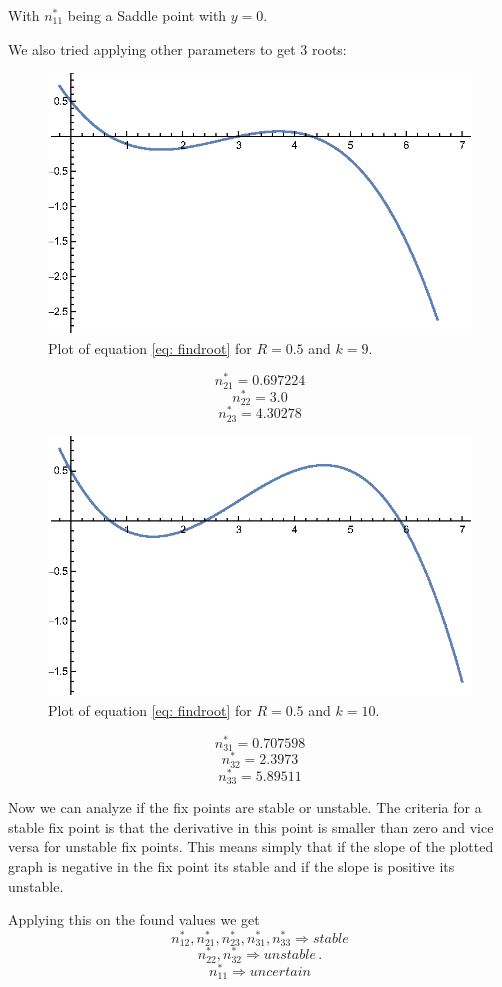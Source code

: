 \documentclass[11pt, a4paper, reqno]{scrartcl}
\begin{document}
	 	 With $n^{\ast}_{11}$ being a Saddle point with $y=0$.
	 	 
	 	 We also tried applying other parameters to get 3 roots:
	 	 
	 	 \begin{figure}[H]
	 	 	\centering
	 	 	\includegraphics[]{CompPhys_6-2_gr3.eps}
	 	 	\caption{Plot of equation \eqref{eq: findroot} for $R = 0.5$ and $k=9$.}
	 	 	\label{fig: 2}
	 	 \end{figure}
	 	 \[n^{\ast}_{21} = 0.697224\]
	 	 \[n^{\ast}_{22} = 3.0\]
	 	 \[n^{\ast}_{23} = 4.30278\]
	 	 \begin{figure}[H]
	 	 	\centering
	 	 	\includegraphics[]{CompPhys_6-2_gr2.eps}
	 	 	\caption{Plot of equation \eqref{eq: findroot} for $R = 0.5$ and $k=10$.}
	 	 	\label{fig: 3}
	 	 \end{figure}
	 	 \[n^{\ast}_{31} = 0.707598\]
  		 \[n^{\ast}_{32} = 2.3973\]
		 \[n^{\ast}_{33} = 5.89511\]
		 
		 Now we can analyze if the fix points are stable or unstable. 
		 The criteria for a stable fix point is that the derivative in this point is smaller than zero and vice versa for unstable fix points.
		 This means simply that if the slope of the plotted graph is negative in the fix point its stable and if the slope is positive its unstable. 
		 
		 Applying this on the found values we get 
		 \[n^{\ast}_{12},n^{\ast}_{21},n^{\ast}_{23},n^{\ast}_{31},n^{\ast}_{33}  \Rightarrow stable \]
		 \[n^{\ast}_{22}, n^{\ast}_{32} \Rightarrow unstable\, .\]
		 \[n^{\ast}_{11} \Rightarrow uncertain\]
 	 	 
	 	 
	 	
\end{document}
